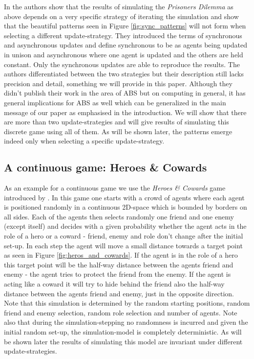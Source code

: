 In \cite{huberman_evolutionary_1993} the authors show that the results of simulating the \textit{Prisoners Dilemma} as above depends on a very specific strategy of iterating the simulation and show that the beautiful patterns seen in Figure \ref{fig:sync_patterns} will not form when selecting a different update-strategy. They introduced the terms of synchronous and asynchronous updates and define synchronous to be as agents being updated in unison and asynchronous where one agent is updated and the others are held constant. Only the synchronous updates are able to reproduce the results. The authors differentiated between the two strategies but their description still lacks precision and detail, something we will provide in this paper. Although they didn't publish their work in the area of ABS but on computing in general, it has general implications for ABS as well which can be generalized in the main message of our paper as emphasised in the introduction. We will show that there are more than two update-strategies and will give results of simulating this discrete game using all of them. As will be shown later, the patterns emerge indeed only when selecting a specific update-strategy.

\subsection{A continuous game: Heroes \& Cowards}
As an example for a continuous game we use the \textit{Heroes \& Cowards} game introduced by \cite{wilensky_introduction_2015}. In this game one starts with a crowd of agents where each agent is positioned randomly in a continuous 2D-space which is bounded by borders on all sides. Each of the agents then selects randomly one friend and one enemy (except itself) and decides with a given probability whether the agent acts in the role of a hero or a coward - friend, enemy and role don't change after the initial set-up. In each step the agent will move a small distance towards a target point as seen in Figure \ref{fig:heros_and_cowards}. If the agent is in the role of a hero this target point will be the half-way distance between the agents friend and enemy - the agent tries to protect the friend from the enemy. If the agent is acting like a coward it will try to hide behind the friend also the half-way distance between the agents friend and enemy, just in the opposite direction. Note that this simulation is determined by the random starting positions, random friend and enemy selection, random role selection and number of agents. Note also that during the simulation-stepping no randomness is incurred and given the initial random set-up, the simulation-model is completely deterministic. As will be shown later the results of simulating this model are invariant under different update-strategies.

